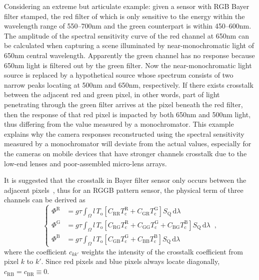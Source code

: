 \documentclass[9pt,twocolumn,twoside]{osajnl}
\newcommand{\D}{\mathrm{d}}
\begin{document}
Considering an extreme but articulate example: given a sensor with RGB Bayer filter stamped, the red filter of which is only sensitive to the energy within the wavelength range of 550--700nm and the green counterpart is within 450--600nm. The amplitude of the spectral sensitivity curve of the red channel at 650nm can be calculated when capturing a scene illuminated by near-monochromatic light of 650nm central wavelength. Apparently the green channel has no response because 650nm light is filtered out by the green filter. Now the near-monochromatic light source is replaced by a hypothetical source whose spectrum consists of two narrow peaks locating at 500nm and 650nm, respectively. If there exists crosstalk between the adjacent red and green pixel, in other words, part of light penetrating through the green filter arrives at the pixel beneath the red filter, then the response of that red pixel is impacted by both 650nm and 500nm light, thus differing from the value measured by a monochromator. This example explains why the camera responses reconstructed using the spectral sensitivity measured by a monochromator will deviate from the actual values, especially for the cameras on mobile devices that have stronger channels crosstalk due to the low-end lenses and poor-assembled micro-lens arrays.

It is suggested that the crosstalk in Bayer filter sensor only occurs between the adjacent pixels~\cite{Getman:07}, thus for an RGGB pattern sensor, the physical term of three channels can be derived as
\begin{equation}
\left\{\begin{aligned}
\Phi^\text{R} &= g\tau\int_\Omega{}l\,T_\text{o}\left[C_\text{RR}T_\text{c}^\text{R}+C_\text{GR}T_\text{c}^\text{G}\right]S_\text{Q}\,\D{\lambda} \\
\Phi^\text{G} &= g\tau\int_\Omega{}l\,T_\text{o}\left[C_\text{RG}T_\text{c}^\text{R}+C_\text{GG}T_\text{c}^\text{G}+C_\text{BG}T_\text{c}^\text{B}\right]S_\text{Q}\,\D{\lambda} \\
\Phi^\text{B} &= g\tau\int_\Omega{}l\,T_\text{o}\left[C_\text{GB}T_\text{c}^\text{G}+C_\text{BB}T_\text{c}^\text{B}\right]S_\text{Q}\,\D{\lambda}
\end{aligned}\right.\,,
\label{eq:7}
\end{equation}
where the coefficient $c_{kk'}$ weights the intensity of the crosstalk coefficient from pixel $k$ to $k'$. Since red pixels and blue pixels always locate diagonally, $c_\text{RB} = c_\text{BR}\equiv0$.
\end{document}
